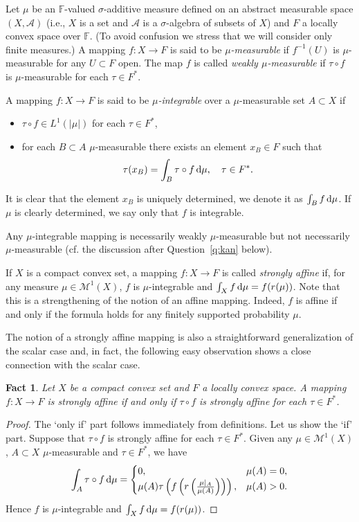 \documentclass{amsart}
\numberwithin{equation}{section}
\newtheorem{fact}[thm]{Fact}
\theoremstyle{definition}
\def\A{\mathcal A}
\def\M{\mathcal M}
\def\ef{\mathbb F}
\def\di{\,\mbox{\rm d}}
\begin{document}
Let $\mu$ be an $\ef$-valued $\sigma$-additive measure defined on an abstract measurable space $(X,\A)$ (i.e., $X$ is a set and $\A$ is a $\sigma$-algebra of subsets of $X$)
and $F$ a locally convex space over $\ef$. (To avoid confusion we stress that we will consider only finite measures.) A mapping $f:X\to F$ is said to be \emph{$\mu$-measurable} if $f^{-1}(U)$ is $\mu$-measurable for any $U\subset F$ open. The map $f$ is called  \emph{weakly $\mu$-measurable} if $\tau\circ f$ is $\mu$-measurable for each $\tau\in F^*$.

A mapping $f:X\to F$ is said to be  \emph{$\mu$-integrable} over a $\mu$-measurable set $A\subset X$ if
\begin{itemize}
\item $\tau\circ f\in L^1(|\mu|)$ for each $\tau\in F^*$,
\item for each $B\subset A$ $\mu$-measurable there exists an element $x_B\in F$ such that
\[
\tau(x_B)=\int_B \tau\circ f\di \mu,\quad \tau\in F^*.
\]
\end{itemize}
It is clear that the element $x_B$ is uniquely determined, we denote it as $\int_B f\di\mu$. If $\mu$ is clearly determined, we say only that $f$ is integrable.

Any $\mu$-integrable mapping is necessarily weakly $\mu$-measurable but not necessarily $\mu$-measurable (cf. the discussion after Question~\ref{q:kan} below).

If $X$ is a compact convex set, a mapping $f\colon X\to F$ is called \emph{strongly affine} if,
for any  measure $\mu\in\M^1(X)$, $f$ is $\mu$-integrable and $\int_X f\di\mu=f(r(\mu))$. Note that this is a 
strengthening of the notion of an affine mapping. Indeed, $f$ is affine if and only if the formula holds for any finitely
supported probability $\mu$. 

The notion of a strongly affine mapping is also a straightforward generalization of the scalar case and, in fact, the following easy observation shows a close connection with the scalar case.

\begin{fact}\label{fact1} Let $X$ be a compact convex set and $F$ a locally convex space. A mapping $f:X\to F$ is strongly affine if and only if $\tau\circ f$ is strongly affine for each $\tau\in F^*$.
\end{fact}

\begin{proof} The `only if' part follows immediately from definitions. Let us show the `if' part. Suppose that $\tau\circ f$ is strongly affine for each $\tau\in F^*$. Given any $\mu\in\M^1(X)$, $A\subset X$ $\mu$-measurable and $\tau\in F^*$,
we have
$$\int_A \tau\circ f\di\mu = \begin{cases} 0, & \mu(A)=0,\\ \mu(A) \tau\left(f\left(r\left(\frac{\mu|_A}{\mu(A)}\right)\right)\right), &\mu(A)>0.\end{cases}$$
Hence $f$ is $\mu$-integrable and $\int_X f\di\mu=f(r(\mu))$.
\end{proof}
\end{document}
